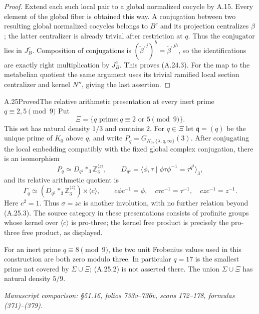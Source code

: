 \begin{proof}
Extend each such local pair to a global normalized
cocycle by A.15. Every element of the global fiber is
obtained this way. A conjugation between two resulting
global normalized cocycles belongs to $B^c$ and its
projection centralizes $\beta$; the latter centralizer
is already trivial after restriction at $q$. Thus the
conjugator lies in $J_B^c$. Composition of conjugations
is $(\widetilde\beta^{,j})^h
=\widetilde\beta^{,jh}$, so the identifications are
exactly right multiplication by $J_B^c$. This proves
(A.24.3). For the map to the metabelian quotient the
same argument uses its trivial ramified local section
centralizer and kernel $N''$, giving the last assertion.
\end{proof}

\begin{statement}{A.25}{Proved}{The relative arithmetic presentation at every inert prime $q\equiv2,5\pmod9$}
Put
\[
 \Xi=\{q\text{ prime}:q\equiv2\text{ or }5\pmod9\}.
 \tag{A.25.1}
\]
This set has natural density $1/3$ and contains $2$.
For $q\in\Xi$ let $\mathfrak q=(q)$ be the unique
prime of $K_0$ above $q$, and write
$P_q=G_{K_0,\{\lambda,\mathfrak q,\infty\}}(3)$.
After conjugating the local embedding compatibly with
the fixed global complex conjugation, there is an
isomorphism
\[
 P_q\simeq D_{q^2}*_{3}\mathbb Z_3^{\langle z\rangle},
 \qquad
 D_{q^2}=\langle\phi,\tau\mid
                  \phi\tau\phi^{-1}=\tau^{q^2}\rangle_3,
 \tag{A.25.2}
\]
and its relative arithmetic quotient is
\[
 \Gamma_q\simeq
 (D_{q^2}*_{3}\mathbb Z_3^{\langle z\rangle})
                   \rtimes\langle c\rangle,
 \qquad
 c\phi c^{-1}=\phi,\quad
 c\tau c^{-1}=\tau^{-1},\quad czc^{-1}=z^{-1}.
 \tag{A.25.3}
\]
Here $c^2=1$. Thus $\sigma=zc$ is another involution,
with no further relation beyond (A.25.3). The source
category in these presentations consists of profinite
groups whose kernel over $\langle c\rangle$ is pro-three;
the kernel free product is precisely the pro-three free
product, as displayed.

For an inert prime $q\equiv8\pmod9$, the two unit
Frobenius values used in this construction are both zero
modulo three. In particular $q=17$ is the smallest prime
not covered by $\Sigma\cup\Xi$; (A.25.2) is not asserted
there. The union $\Sigma\cup\Xi$ has natural density
$5/9$.
\par\smallskip\noindent\emph{Manuscript comparison: \S51.16,
folios 733v--736v, scans 172--178, formulas (371)--(379).}
\end{statement}
